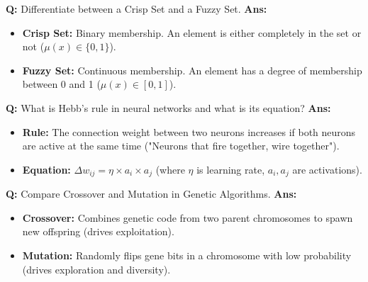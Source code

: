 \documentclass[10pt,a4paper,twocolumn]{article}
\begin{document}
\begin{tcolorbox}[
  colback=white,
  colframe=UnitColorEight,
  colbacktitle=gray!10!white,
  coltitle=black,
  fonttitle=\bfseries\sffamily\small,
  title={Unit VIII $\bullet$ Card 6: Crisp vs. Fuzzy Set},
  boxrule=1.2pt,
  arc=2mm,
  outer arc=2mm,
  boxsep=1.5mm,
  top=1mm,
  bottom=1mm,
  left=1.5mm,
  right=1.5mm,
  before skip=2.5mm,
  after skip=2.5mm
]
\textbf{Q:} Differentiate between a Crisp Set and a Fuzzy Set.
\tcbline
\textbf{Ans:} \begin{itemize}
  \item   \textbf{Crisp Set:} Binary membership. An element is either completely in the set or not ($\mu(x) \in \{0, 1\}$).
  \item   \textbf{Fuzzy Set:} Continuous membership. An element has a degree of membership between 0 and 1 ($\mu(x) \in [0, 1]$).
\end{itemize}
\end{tcolorbox}


\begin{tcolorbox}[
  colback=white,
  colframe=UnitColorEight,
  colbacktitle=gray!10!white,
  coltitle=black,
  fonttitle=\bfseries\sffamily\small,
  title={Unit VIII $\bullet$ Card 7: Hebbian Learning},
  boxrule=1.2pt,
  arc=2mm,
  outer arc=2mm,
  boxsep=1.5mm,
  top=1mm,
  bottom=1mm,
  left=1.5mm,
  right=1.5mm,
  before skip=2.5mm,
  after skip=2.5mm
]
\textbf{Q:} What is Hebb's rule in neural networks and what is its equation?
\tcbline
\textbf{Ans:} \begin{itemize}
  \item   \textbf{Rule:} The connection weight between two neurons increases if both neurons are active at the same time ("Neurons that fire together, wire together").
  \item   \textbf{Equation:} $\Delta w_{ij} = \eta \times a_i \times a_j$ (where $\eta$ is learning rate, $a_i, a_j$ are activations).
\end{itemize}
\end{tcolorbox}


\begin{tcolorbox}[
  colback=white,
  colframe=UnitColorEight,
  colbacktitle=gray!10!white,
  coltitle=black,
  fonttitle=\bfseries\sffamily\small,
  title={Unit VIII $\bullet$ Card 8: Genetic Algorithm Crossover vs. Mutation},
  boxrule=1.2pt,
  arc=2mm,
  outer arc=2mm,
  boxsep=1.5mm,
  top=1mm,
  bottom=1mm,
  left=1.5mm,
  right=1.5mm,
  before skip=2.5mm,
  after skip=2.5mm
]
\textbf{Q:} Compare Crossover and Mutation in Genetic Algorithms.
\tcbline
\textbf{Ans:} \begin{itemize}
  \item   \textbf{Crossover:} Combines genetic code from two parent chromosomes to spawn new offspring (drives exploitation).
  \item   \textbf{Mutation:} Randomly flips gene bits in a chromosome with low probability (drives exploration and diversity).
\end{itemize}
\end{tcolorbox}
\end{document}
